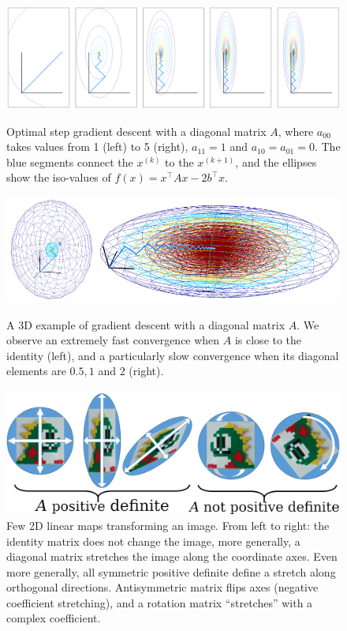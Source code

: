 \documentclass[notitlepage,oneside]{book}
\begin{document}
\begin{figure}[p]
  \centering
  \includegraphics[width=1\linewidth]{img/cg/gradient2Dconverge.png}
  \caption{
Optimal step gradient descent with a diagonal matrix $A$, where $a_{00}$ takes values from 1 (left) to 5 (right), $a_{11}=1$ and $a_{10}=a_{01}=0$.
The blue segments connect the $x^{(k)}$ to the $x^{(k+1)}$, and the ellipses show the iso-values of $f(x)=x^\top Ax-2b^\top x$.
}
  \label{fig:gradient2dconverge1}

  \includegraphics[width=1\linewidth]{img/cg/gradient3Dconverge1.png}
  \caption{
  A 3D example of gradient descent with a diagonal matrix $A$. We observe an extremely fast convergence when $A$ is close to the identity (left), 
  and a particularly slow convergence when its diagonal elements are $0.5,1$ and $2$ (right). }
  \label{fig:gradient3dconverge1}

  \includegraphics[width = \linewidth]{img/cg/defpositiveness.png}
  \caption{
Few 2D linear maps transforming an image.
From left to right: the identity matrix does not change the image, more generally, a diagonal matrix stretches the image along the coordinate axes.
Even more generally, all symmetric positive definite define a stretch along orthogonal directions.
Antisymmetric matrix flips axes (negative coefficient stretching),
and a rotation matrix  ``stretches'' with a complex coefficient.}
  \label{fig:eigenSPD}

\end{figure}
\end{document}
